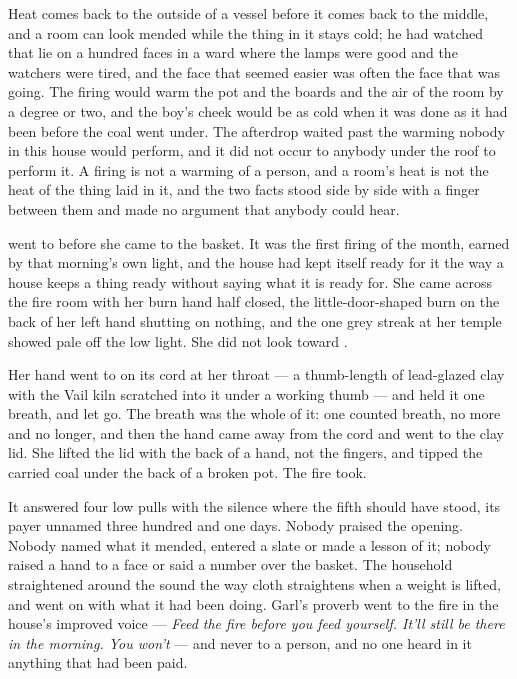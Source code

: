 Heat comes back to the outside of a vessel before it comes back to the middle, and a room can look mended while the thing in it stays cold; he had watched that lie on a hundred faces in a ward where the lamps were good and the watchers were tired, and the face that seemed easier was often the face that was going. The firing would warm the pot and the boards and the air of the room by a degree or two, and the boy's cheek would be as cold when it was done as it had been before the coal went under. The afterdrop waited past the warming nobody in this house would perform, and it did not occur to anybody under the roof to perform it. A firing is not a warming of a person, and a room's heat is not the heat of the thing laid in it, and the two facts stood side by side with a finger between them and made no argument that anybody could hear.

\scenebreak

 went to  before she came to the basket. It was the first firing of the month, earned by that morning's own light, and the house had kept itself ready for it the way a house keeps a thing ready without saying what it is ready for. She came across the fire room with her burn hand half closed, the little-door-shaped burn on the back of her left hand shutting on nothing, and the one grey streak at her temple showed pale off the low light. She did not look toward .

Her hand went to  on its cord at her throat --- a thumb-length of lead-glazed clay with the Vail kiln scratched into it under a working thumb --- and held it one breath, and let go. The breath was the whole of it: one counted breath, no more and no longer, and then the hand came away from the cord and went to the clay lid. She lifted the lid with the back of a hand, not the fingers, and tipped the carried coal under the back of a broken pot. The fire took.

It answered four low pulls with the silence where the fifth should have stood, its payer unnamed three hundred and one days. Nobody praised the opening. Nobody named what it mended, entered a slate or made a lesson of it; nobody raised a hand to a face or said a number over the basket. The household straightened around the sound the way cloth straightens when a weight is lifted, and went on with what it had been doing. Garl's proverb went to the fire in the house's improved voice --- \emph{Feed the fire before you feed yourself. It'll still be there in the morning. You won't} --- and never to a person, and no one heard in it anything that had been paid.

